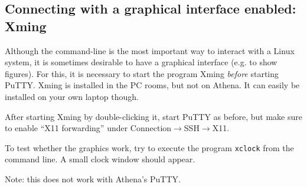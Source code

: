 \documentclass[a4paper]{article}
\begin{document}
\subsection{Connecting with a graphical interface enabled: Xming\label{app:GUI}}
%
\par
Although the command-line is the most important way to interact with a Linux system, it is sometimes desirable to have a graphical interface (e.g. to show figures). For this, it is necessary to start the program Xming \emph{before} starting PuTTY. Xming is installed in the PC rooms, but not on Athena. It can easily be installed on your own laptop though.
%
\par
After starting Xming by double-clicking it, start PuTTY as before, but make sure to enable ``X11 forwarding'' under Connection$\rightarrow$SSH$\rightarrow$X11.
%
\par
To test whether the graphics work, try to execute the program \verb+xclock+ from the command line. A small clock window should appear.
%
\par
Note: this does not work with Athena's PuTTY.
%
\end{document}
